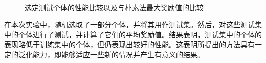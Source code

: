 \begin{figure}[htbp]
  \quad\quad
  \\
  \quad\quad
  \caption{选定测试个体的性能比较以及与朴素法最大奖励值的比较}
  \label{com}
\end{figure}

在本次实验中，随机选取了一部分个体，并将其用作测试集。然后，对这些测试集中的个体进行了测试，并计算了它们的平均奖励值。结果表明，测试集中的个体的表现略低于训练集中的个体，但仍表现出较好的性能。这表明所提出的方法具有一定的泛化能力，即能够适应一些新的情况并产生有意义的结果。


